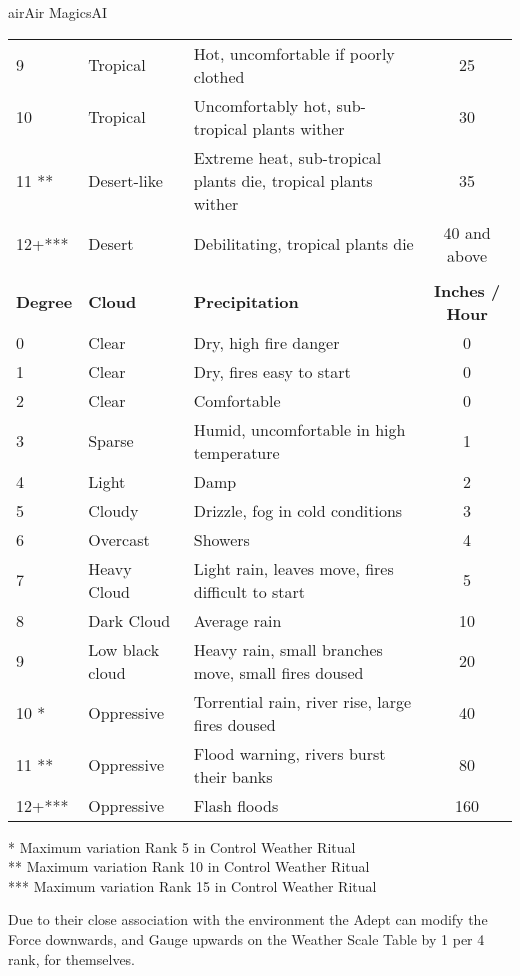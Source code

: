 \begin{college}[2.1]{air}{Air Magics}{AI}
\begin{table*}
\begin{tabularx}{\linewidth}{llXc}
9	& Tropical	& Hot, uncomfortable if poorly clothed & 25 \\
10	& Tropical	& Uncomfortably hot, sub-tropical plants wither & 30 \\
11 **	& Desert-like	& Extreme heat, sub-tropical plants die, tropical plants wither & 35 \\
12+*** & Desert	& Debilitating, tropical plants die & 40 and above \\
\\
\textbf{Degree}	& \textbf{Cloud} & \textbf{Precipitation} & \textbf{Inches / Hour} \\
0 & Clear & Dry, high fire danger 						& 0 \\
1 & Clear & Dry, fires easy to start						& 0 \\
2 & Clear & Comfortable 							& 0 \\
3 & Sparse & Humid, uncomfortable in high temperature				& 1 \\
4 & Light & Damp								& 2 \\
5 & Cloudy & Drizzle, fog in cold conditions					& 3 \\
6 & Overcast & Showers								& 4 \\
7 & Heavy Cloud & Light rain, leaves move, fires difficult to start		& 5 \\
8 & Dark Cloud & Average rain							& 10 \\
9 & Low black cloud & Heavy rain, small branches move, small fires doused	& 20\\
10 * & Oppressive & Torrential rain, river rise, large fires doused		& 40 \\
11 ** & Oppressive & Flood warning, rivers burst their banks			& 80 \\
12+*** & Oppressive & Flash floods						& 160 \\
\end{tabularx}

\begin{flushleft}
* Maximum variation Rank 5 in Control Weather Ritual\\
** Maximum variation Rank 10 in Control Weather Ritual \\
*** Maximum variation Rank 15 in Control Weather Ritual \\
\end{flushleft}

\begin{multicols}{2}
\begin{Description}
\item[T1 Aerial Affinity (Air Mage Talent)]
Due to their close association with the environment the Adept can
modify the Force downwards, and Gauge upwards on the Weather Scale
Table by 1 per 4 rank, for themselves.


\end{Description}
\end{multicols}
\end{table*}
\end{college}
